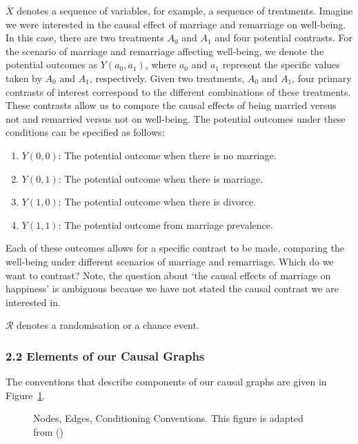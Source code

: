 \documentclass[
  singlecolumn]{article}
\providecommand{\tightlist}{%
  \setlength{\itemsep}{0pt}\setlength{\parskip}{0pt}}\usepackage{longtable,booktabs,array}
\begin{document}
\(\bar{X}\) denotes a sequence of variables, for example, a sequence of
treatments. Imagine we were interested in the causal effect of marriage
and remarriage on well-being. In this case, there are two treatments
\(A_0\) and \(A_1\) and four potential contrasts. For the scenario of
marriage and remarriage affecting well-being, we denote the potential
outcomes as \(Y(a_0, a_1)\), where \(a_0\) and \(a_1\) represent the
specific values taken by \(A_0\) and \(A_1\), respectively. Given two
treatments, \(A_0\) and \(A_1\), four primary contrasts of interest
correspond to the different combinations of these treatments. These
contrasts allow us to compare the causal effects of being married versus
not and remarried versus not on well-being. The potential outcomes under
these conditions can be specified as follows:

\begin{enumerate}
\def\labelenumi{\arabic{enumi}.}
\tightlist
\item
  \(Y(0, 0)\): The potential outcome when there is no marriage.
\item
  \(Y(0, 1)\): The potential outcome when there is marriage.
\item
  \(Y(1, 0)\): The potential outcome when there is divorce.
\item
  \(Y(1, 1)\): The potential outcome from marriage prevalence.
\end{enumerate}

Each of these outcomes allows for a specific contrast to be made,
comparing the well-being under different scenarios of marriage and
remarriage. Which do we want to contrast? Note, the question about `the
causal effects of marriage on happiness' is ambiguous because we have
not stated the causal contrast we are interested in.

\(\mathcal{R}\) denotes a randomisation or a chance event.

\subsubsection{2.2 Elements of our Causal
Graphs}\label{elements-of-our-causal-graphs}

The conventions that describe components of our causal graphs are given
in Figure~\ref{fig-general}.

\begin{figure}

\centering{

\[
\terminologygeneral
\]

}

\caption{\label{fig-general}Nodes, Edges, Conditioning Conventions. This
figure is adapted from ()}

\end{figure}%
\end{document}
